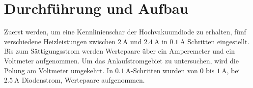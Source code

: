 \section{Durchführung und Aufbau}
\label{sec:Aufbau}
Zuerst werden, um eine Kennlinienschar der Hochvakuumdiode zu erhalten, fünf
verschiedene Heizleistungen zwischen $\SI{2}{\ampere}$ und $\SI{2.4}{\ampere}$
in $\SI{0.1}{\ampere}$ Schritten eingestellt. Bis zum Sättigungsstrom werden
Wertepaare über ein Amperemeter und ein Voltmeter aufgenommen.
Um das Anlaufstromgebiet zu untersuchen, wird die Polung am Voltmeter
umgekehrt. In $\SI{0.1}{\ampere}$-Schritten wurden von 0 bis $\SI{1}{\ampere}$,
bei $\SI{2.5}{\ampere}$ Diodenstrom, Wertepaare aufgenommen.
